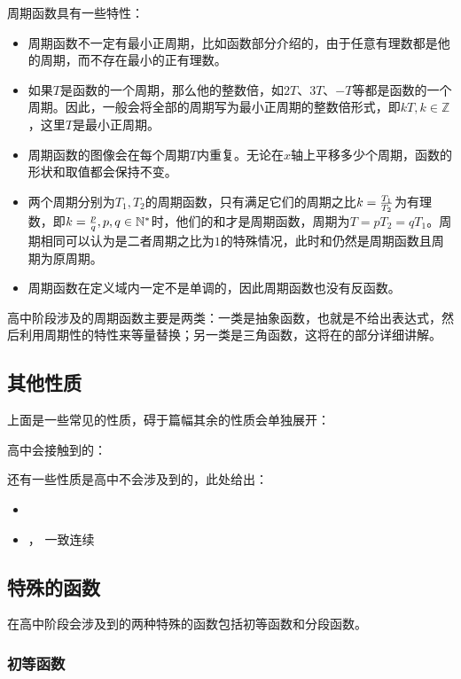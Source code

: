 周期函数具有一些特性：
\begin{itemize}
\item 周期函数不一定有最小正周期，比如函数部分介绍的，由于任意有理数都是他的周期，而不存在最小的正有理数。
\item 如果$T$是函数的一个周期，那么他的整数倍，如$2T$、$3T$、$-T$等都是函数的一个周期。因此，一般会将全部的周期写为最小正周期的整数倍形式，即$kT,k\in \mathbb{Z}$，这里$T$是最小正周期。
\item 周期函数的图像会在每个周期$T$内重复。无论在$x$轴上平移多少个周期，函数的形状和取值都会保持不变。
\item 两个周期分别为$T_1,T_2$的周期函数，只有满足它们的周期之比$k={T_1\over T_2}$为有理数，即$k={p\over q},p,q\in\mathbb{N}^*$时，他们的和才是周期函数，周期为$T=pT_2=qT_1$。周期相同可以认为是二者周期之比为$1$的特殊情况，此时和仍然是周期函数且周期为原周期。
\item 周期函数在定义域内一定不是单调的，因此周期函数也没有反函数。
\end{itemize}

高中阶段涉及的周期函数主要是两类：一类是抽象函数，也就是不给出表达式，然后利用周期性的特性来等量替换；另一类是三角函数，这将在的部分详细讲解。

\subsection{其他性质}

上面是一些常见的性质，碍于篇幅其余的性质会单独展开：

高中会接触到的：


还有一些性质是高中不会涉及到的，此处给出：
\begin{itemize}
\item {}
\item {}， 一致连续
\end{itemize}

\subsection{特殊的函数}

在高中阶段会涉及到的两种特殊的函数包括初等函数和分段函数。

\subsubsection{初等函数}

